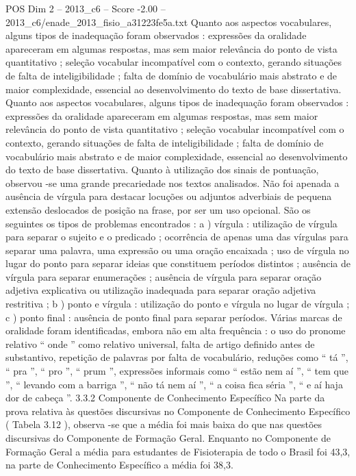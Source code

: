 \begin{textsample}{POS Dim 2 – 2013\_c6 – Score -2.00 – 2013\_c6/enade\_2013\_fisio\_a31223fe5a.txt}
Quanto aos aspectos vocabulares, alguns tipos de inadequação foram observados : expressões da oralidade apareceram em algumas respostas, mas sem maior relevância do ponto de vista quantitativo ; seleção vocabular incompatível com o contexto, gerando situações de falta de inteligibilidade ; falta de domínio de vocabulário mais abstrato e de maior complexidade, essencial ao desenvolvimento do texto de base dissertativa.
Quanto aos aspectos vocabulares, alguns tipos de inadequação foram observados : expressões da oralidade apareceram em algumas respostas, mas sem maior relevância do ponto de vista quantitativo ; seleção vocabular incompatível com o contexto, gerando situações de falta de inteligibilidade ; falta de domínio de vocabulário mais abstrato e de maior complexidade, essencial ao desenvolvimento do texto de base dissertativa.
Quanto à utilização dos sinais de pontuação, observou -se uma grande precariedade nos textos analisados.
Não foi apenada a ausência de vírgula para destacar locuções ou adjuntos adverbiais de pequena extensão deslocados de posição na frase, por ser um uso opcional.
São os seguintes os tipos de problemas encontrados : a ) vírgula : utilização de vírgula para separar o sujeito e o predicado ; ocorrência de apenas uma das vírgulas para separar uma palavra, uma expressão ou uma oração encaixada ; uso de vírgula no lugar do ponto para separar ideias que constituem períodos distintos ; ausência de vírgula para separar enumerações ; ausência de vírgula para separar oração adjetiva explicativa ou utilização inadequada para separar oração adjetiva restritiva ; b ) ponto e vírgula : utilização do ponto e vírgula no lugar de vírgula ; c ) ponto final : ausência de ponto final para separar períodos.
Várias marcas de oralidade foram identificadas, embora não em alta frequência : o uso do pronome relativo “ onde ” como relativo universal, falta de artigo definido antes de substantivo, repetição de palavras por falta de vocabulário, reduções como “ tá ”, “ pra ”, “ pro ”, “ prum ”, expressões informais como “ estão nem aí ”, “ tem que ”, “ levando com a barriga ”, “ não tá nem aí ”, “ a coisa fica séria ”, “ e aí haja dor de cabeça ”. 3.3.2 Componente de Conhecimento Específico Na parte da prova relativa às questões discursivas no Componente de Conhecimento Específico ( Tabela 3.12 ), observa -se que a média foi mais baixa do que nas questões discursivas do Componente de Formação Geral.
Enquanto no Componente de Formação Geral a média para estudantes de Fisioterapia de todo o Brasil foi 43,3, na parte de Conhecimento Específico a média foi 38,3.

\end{textsample}
